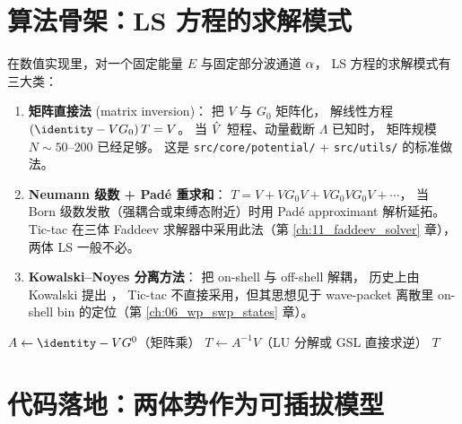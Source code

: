 \section{算法骨架：LS 方程的求解模式}
\label{sec:ch01-algo}

在数值实现里，对一个固定能量 $E$ 与固定部分波通道 $\alpha$，
LS 方程的求解模式有三大类：
\begin{enumerate}
  \item \textbf{矩阵直接法} (matrix inversion)：
        把 $V$ 与 $G_0$ 矩阵化，
        解线性方程 $(\identity - V G_0)\, T = V$。
        当 $\hat{V}$ 短程、动量截断 $\Lambda$ 已知时，
        矩阵规模 $N \sim 50\text{--}200$ 已经足够。
        这是 \texttt{src/core/potential/} + \texttt{src/utils/} 的标准做法。
  \item \textbf{Neumann 级数 + Padé 重求和}：
        $T = V + V G_0 V + V G_0 V G_0 V + \cdots$，
        当 Born 级数发散（强耦合或束缚态附近）时用 Padé approximant 解析延拓。
        Tic-tac 在三体 Faddeev 求解器中采用此法（第 \ref{ch:11_faddeev_solver} 章），
        两体 LS 一般不必。
  \item \textbf{Kowalski--Noyes 分离方法}：
        把 on-shell 与 off-shell 解耦，
        历史上由 Kowalski 提出 \cite{KowalskiNoyes1966}，
        Tic-tac 不直接采用，但其思想见于 wave-packet 离散里 on-shell bin 的定位（第 \ref{ch:06_wp_swp_states} 章）。
\end{enumerate}

\begin{algorithm}[H]
  \caption{两体 LS 方程在固定能量 $E$、固定部分波 $(\ell, s, j)$ 上的求解（矩阵直接法骨架）}
  \label{alg:ch01-LS-solve}
  $A \leftarrow \identity - V G^0$（矩阵乘）\;
  $T \leftarrow A^{-1} V$（LU 分解或 GSL 直接求逆）\;
  \Return $T$\;
\end{algorithm}

\section{代码落地：两体势作为可插拔模型}
\label{sec:ch01-code}

